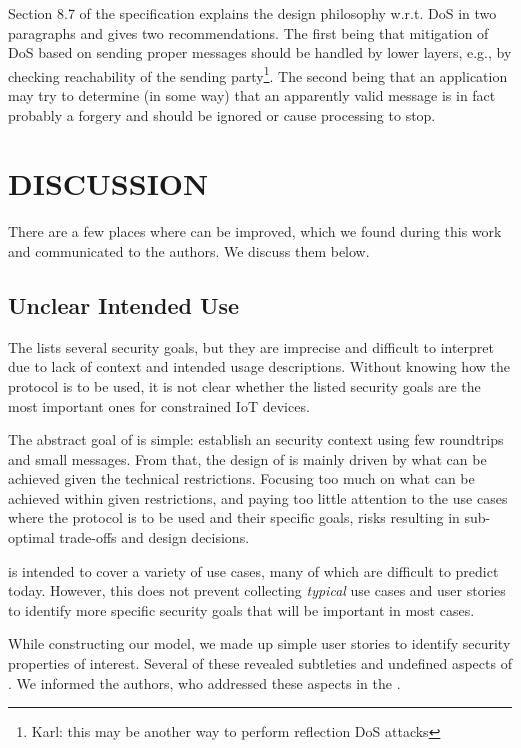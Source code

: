 \documentclass[runningheads]{llncs}
\begin{document}
Section 8.7 of the \mEdhoc{} specification explains the design philosophy w.r.t.
DoS in two paragraphs and gives two recommendations.
%
The first being that mitigation of DoS based on sending proper messages should
be handled by lower layers, e.g., by checking reachability of the sending
party\footnote{Karl: this may be another way to perform reflection DoS attacks}.
%
The second being that an application may try to determine (in some way) that an
apparently valid message is in fact probably a forgery and should be ignored or
cause processing to stop.
%

\section{\uppercase{Discussion}}
\label{sec:discussion}
There are a few places where \mEdhoc{} can be improved,
which we found during this work and communicated to the authors.
%
We discuss them below.
%

\subsection{Unclear Intended Use}
\label{sec:unclearProtocolUse}
%
The \mEdhoc{} \mSpec{} lists several security goals, but they are
imprecise and difficult to interpret due to lack of context and intended usage
descriptions.
%
Without knowing how the protocol is to be used,
it is not clear whether the listed security goals are the most important ones
for constrained IoT devices.
%

The abstract goal of \mEdhoc{} is simple: establish an \mOscore{} security
context using few roundtrips and small messages.
%
From that, the design of \mEdhoc{} is mainly driven by what
can be achieved given the technical restrictions.
%
Focusing too much on what can be achieved within given restrictions, and paying
too little attention to the use cases where the
protocol is to be used and their specific goals, risks resulting in
sub-optimal trade-offs and design decisions.
%

\mEdhoc{} is intended to cover a variety of use cases, many of which are
difficult to predict today.
%
However, this does not
prevent collecting \emph{typical} use cases and user stories
to identify more specific security goals that will be important in most cases.
%

While constructing our model, we made up simple user stories to identify
security properties of interest.
%
Several of these revealed subtleties and undefined aspects of \mEdhoc{}.
%
We informed the \mEdhoc{} authors, who addressed these aspects in the
\mSpec{}.
%
\end{document}

